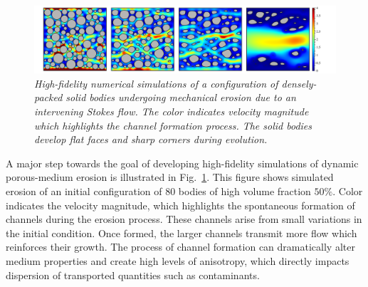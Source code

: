 \documentclass[11pt]{article}
\begin{document}
\begin{figure}%
\begin{center}
\includegraphics[width = 0.99 \textwidth]{./figs/80circ8vel.pdf}
\caption{\label{80circ8vel} \em High-fidelity numerical simulations of a configuration of densely-packed solid bodies undergoing mechanical erosion due to an intervening Stokes flow. The color indicates velocity magnitude which highlights the channel formation process. The solid bodies develop flat faces and sharp corners during evolution. }
\end{center}
\end{figure}

A major step towards the goal of developing high-fidelity simulations of dynamic porous-medium erosion is illustrated in Fig.~\ref{80circ8vel}. This figure shows simulated erosion of an initial configuration of 80 bodies of high volume fraction $50 \%$. Color indicates the velocity magnitude, which highlights the spontaneous formation of channels during the erosion process. These channels arise from small variations in the initial condition. Once formed, the larger channels transmit more flow which reinforces their growth. The process of channel formation can dramatically alter medium properties and create high levels of anisotropy, which directly impacts dispersion of transported quantities such as contaminants.
\end{document}
